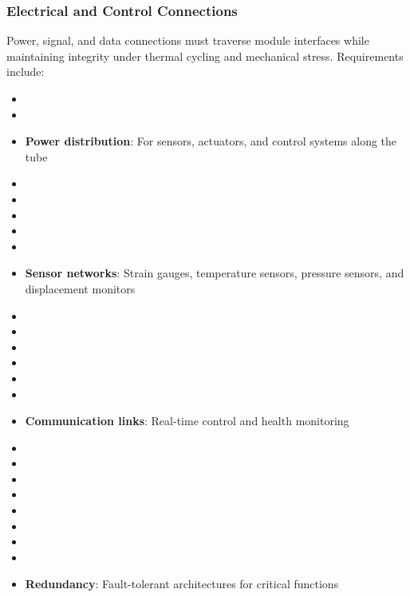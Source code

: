 \subsubsection{Electrical and Control Connections}
Power, signal, and data connections must traverse module interfaces while maintaining integrity under thermal cycling and mechanical stress. Requirements include:
\begin{itemize}
    \item \item \item \textbf{Power distribution}: For sensors, actuators, and control systems along the tube \cite{kimbrough2001}
    \item \item \item \item \item \item \textbf{Sensor networks}: Strain gauges, temperature sensors, pressure sensors, and displacement monitors \cite{wortman2007}
    \item \item \item \item \item \item \item \textbf{Communication links}: Real-time control and health monitoring \cite{ramsey2002}
    \item \item \item \item \item \item \item \item \item \textbf{Redundancy}: Fault-tolerant architectures for critical functions \cite{avizienis2004}
\end{itemize}

